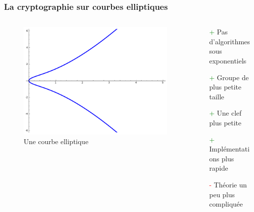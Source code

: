 \documentclass[9pt]{beamer}
\begin{document}
\begin{frame}
    \frametitle{La cryptographie sur courbes elliptiques}
    \begin{columns}[tb]
        \begin{column}{0.35\linewidth}
            \vfill
            \begin{figure}
                \begin{center}
                    \includegraphics[scale=0.18]{ecc.png}
                \end{center}
                \caption{Une courbe elliptique}
            \end{figure}
        \end{column}
        \begin{column}{0.6\linewidth}
            \begin{itemize}
                \item[\textcolor{green}{+}] Pas d'algorithmes sous exponentiels
                    \vfill
                \item[\textcolor{green}{+}] Groupe de plus petite taille
                    \vfill
                \item[\textcolor{green}{+}] Une clef plus petite
                    \vfill
                \item[\textcolor{green}{+}] Implémentations plus rapide
                    \vfill
                \item[\textcolor{red}{-}] Théorie un peu plus compliquée
            \end{itemize}
        \end{column}
    \end{columns}
\end{frame}
\end{document}
